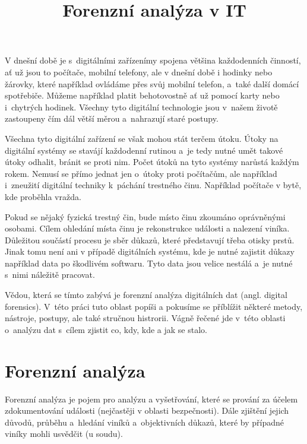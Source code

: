 \documentclass[thesis=B,czech]{FITthesis}[2012/06/26]
\title{Forenzní analýza v IT}
\begin{document}

\begin{introduction}
  \label{sec:uvod}

V dnešní době je s~digitálními zařízenímy spojena většina každodenních činností, ať už jsou to počítače, mobilní telefony, ale v dnešní době i hodinky nebo žárovky, které například ovládáme přes svůj mobilní telefon, a~také další domácí spotřebiče. Můžeme například platit behotovostně ať už pomocí karty nebo i~chytrých hodinek. Všechny tyto digitální technologie jsou v~našem životě zastoupeny čím dál větší měrou a~nahrazují staré postupy. 

Všechna tyto digitální zařízení se však mohou stát terčem útoku. Útoky na digitální systémy se stavájí každodenní rutinou a~je tedy nutné umět takové útoky odhalit, bránit se proti nim. Počet útoků na tyto systémy narůstá každým rokem. Nemusí se přímo jednat jen o~útoky proti počítačům, ale například i~zneužití digitální techniky k~páchání trestného činu. Například počítače v bytě, kde proběhla vražda.

Pokud se nějaký fyzická trestný čin, bude místo činu zkoumáno oprávněnými osobami. Cílem ohledání místa činu je rekonstrukce události a nalezení viníka. Důležitou součástí procesu je sběr důkazů, které představují třeba otisky prstů. Jinak tomu není ani v případě digitálních systému, kde je nutné zajistit důkazy například data po škodlivém softwaru. Tyto data jsou velice nestálá a~je nutné s~nimi náležitě pracovat.

Vědou, která se tímto zabývá je forenzní analýza digitálních dat (angl. digital forensics). V~této práci tuto oblast popíši a pokusíme se příblížit některé metody, nástroje, postupy, ale také stručnou histrorii. Vágně řečené jde v~této oblasti o~analýzu dat s~cílem zjistit co, kdy, kde a jak se stalo.
 

\end{introduction}

\chapter{Forenzní analýza}
Forenzní analýza je pojem pro analýzu a vyšetřování, které se prování za účelem zdokumentování události (nejčastěji v oblasti bezpečnosti). Dále zjištění jejich důvodů, průběhu a~hledání viníků a~objektivních důkazů, které by případné viníky mohli usvědčit (u soudu)\cite{for_uvod}.
\end{document}
